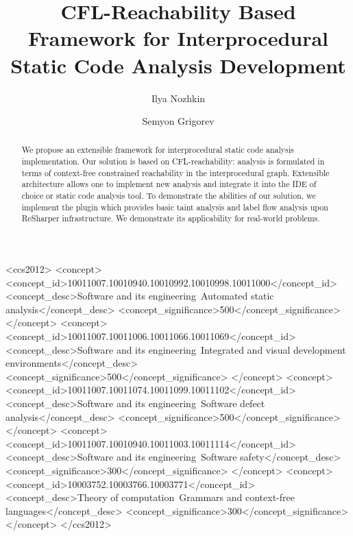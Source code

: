 \documentclass[sigconf]{acmart}
\begin{document}
\title[CFL-Reachability for Interprocedural Static Code Analysis Development]{CFL-Reachability Based Framework for Interprocedural Static Code Analysis Development}

\author{Ilya Nozhkin}

\author{Semyon Grigorev}


\begin{abstract}
We propose an extensible framework for interprocedural static code analysis implementation.
Our solution is based on CFL-reachability: analysis is formulated in terms of context-free constrained reachability in the interprocedural graph.
Extensible architecture allows one to implement new analysis and integrate it into the IDE of choice or static code analysis tool.
To demonstrate the abilities of our solution, we implement the plugin which provides basic taint analysis and label flow analysis upon ReSharper infrastructure.
We demonstrate its applicability for real-world problems.
\end{abstract}


\begin{CCSXML}
<ccs2012>
<concept>
<concept_id>10011007.10010940.10010992.10010998.10011000</concept_id>
<concept_desc>Software and its engineering~Automated static analysis</concept_desc>
<concept_significance>500</concept_significance>
</concept>
<concept>
<concept_id>10011007.10011006.10011066.10011069</concept_id>
<concept_desc>Software and its engineering~Integrated and visual development environments</concept_desc>
<concept_significance>500</concept_significance>
</concept>
<concept>
<concept_id>10011007.10011074.10011099.10011102</concept_id>
<concept_desc>Software and its engineering~Software defect analysis</concept_desc>
<concept_significance>500</concept_significance>
</concept>
<concept>
<concept_id>10011007.10010940.10011003.10011114</concept_id>
<concept_desc>Software and its engineering~Software safety</concept_desc>
<concept_significance>300</concept_significance>
</concept>
<concept>
<concept_id>10003752.10003766.10003771</concept_id>
<concept_desc>Theory of computation~Grammars and context-free languages</concept_desc>
<concept_significance>300</concept_significance>
</concept>
</ccs2012>
\end{CCSXML}
\end{document}

